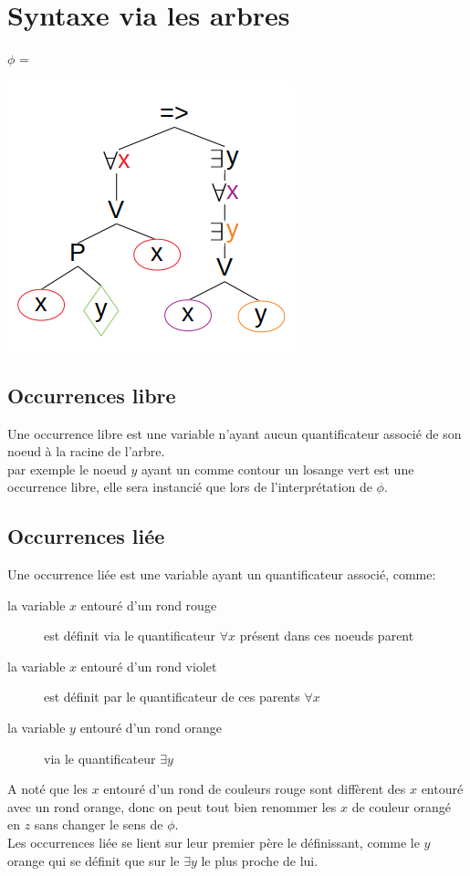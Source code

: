 \section{Syntaxe via les arbres}
$\phi$ = 
\begin{center}
\includegraphics[scale=0.6]{img/of-occ-1.png} 
\end{center}
\subsection{Occurrences libre}
Une occurrence libre est une variable n'ayant aucun quantificateur associé de son noeud à la racine de l'arbre.\\
par exemple le noeud $y$ ayant un comme contour un losange vert est une occurrence libre, elle sera instancié que lors de l'interprétation de $\phi$.\\
\subsection{Occurrences liée}
Une occurrence liée est une variable ayant un quantificateur associé, comme:
\begin{description}
\item[la variable $x$ entouré d'un rond rouge] est définit via le quantificateur $\forall x$ présent dans ces noeuds parent
\item[la variable $x$ entouré d'un rond violet] est définit par le quantificateur de ces parents $\forall x$
\item[la variable $y$ entouré d'un rond orange] via le quantificateur $\exists y$
\end{description}
A noté que les $x$ entouré d'un rond de couleurs rouge sont diffèrent des $x$ entouré avec un rond orange, donc on peut tout bien renommer les $x$ de couleur orangé en $z$ sans changer le sens de $\phi$.\\
Les occurrences liée se lient sur leur premier père le définissant, comme le $y$ orange qui se définit que sur le $\exists y$ le plus proche de lui.\\
